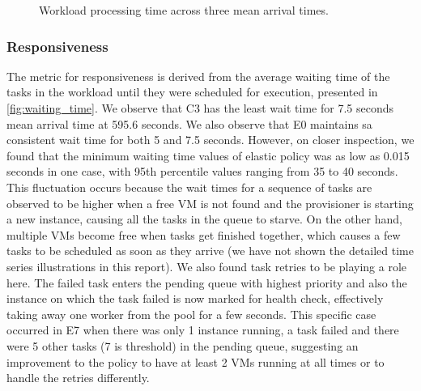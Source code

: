\documentclass[a4paper]{IEEEtran}
\begin{document}
\begin{figure}[tbp]
  \caption{Workload processing time across three mean arrival times.}
  \label{fig:processing_time}
\end{figure}

\subsubsection{Responsiveness}

The metric for responsiveness is derived from the average waiting time of the tasks in the workload until
they were scheduled for execution, presented in \autoref{fig:waiting_time}. We observe that \textsc{C3} has the least wait time for 7.5 seconds mean arrival time at 595.6 seconds. We also observe that \textsc{E0} maintains 
sa consistent wait time for both 5 and 7.5 seconds. However, on closer inspection, we found that the minimum waiting
time values of elastic policy was as low as 0.015 seconds in one case, with 95th percentile values ranging from
35 to 40 seconds. This fluctuation occurs because the wait times for a sequence of tasks are observed to be higher when a free VM is not found and the provisioner is starting a new instance, causing all the tasks in the queue to starve. On the other hand, multiple VMs become free when tasks get finished together, which causes a few tasks to be scheduled as soon as they arrive (we have not shown the detailed time series illustrations in this report). We also
found task retries to be playing a role here. The failed task enters the pending queue with highest priority and also
the instance on which the task failed is now marked for health check, effectively taking away one worker from the pool
for a few seconds. This specific case occurred in E7 when there was only 1 instance running, a task failed and
there were 5 other tasks (7 is threshold) in the pending queue, suggesting an improvement to the policy to have at least 2 VMs running at all times or to handle the retries differently.
\end{document}
